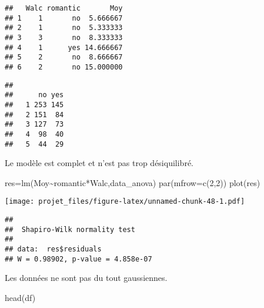 \documentclass[
]{article}
\newenvironment{Shaded}{\begin{snugshade}}{\end{snugshade}}
\newcommand{\AttributeTok}[1]{\textcolor[rgb]{0.77,0.63,0.00}{#1}}
\newcommand{\DecValTok}[1]{\textcolor[rgb]{0.00,0.00,0.81}{#1}}
\newcommand{\FunctionTok}[1]{\textcolor[rgb]{0.00,0.00,0.00}{#1}}
\newcommand{\NormalTok}[1]{#1}
\newcommand{\OtherTok}[1]{\textcolor[rgb]{0.56,0.35,0.01}{#1}}
\newcommand{\SpecialCharTok}[1]{\textcolor[rgb]{0.00,0.00,0.00}{#1}}
\begin{document}
\begin{verbatim}
##   Walc romantic       Moy
## 1    1       no  5.666667
## 2    1       no  5.333333
## 3    3       no  8.333333
## 4    1      yes 14.666667
## 5    2       no  8.666667
## 6    2       no 15.000000
\end{verbatim}

\begin{Shaded}
\end{Shaded}

\begin{verbatim}
##    
##      no yes
##   1 253 145
##   2 151  84
##   3 127  73
##   4  98  40
##   5  44  29
\end{verbatim}

Le modèle est complet et n'est pas trop désiquilibré.

\begin{Shaded}
\begin{Highlighting}[]
\NormalTok{res}\OtherTok{=}\FunctionTok{lm}\NormalTok{(Moy}\SpecialCharTok{\textasciitilde{}}\NormalTok{romantic}\SpecialCharTok{*}\NormalTok{Walc,data\_anova)}
\FunctionTok{par}\NormalTok{(}\AttributeTok{mfrow=}\FunctionTok{c}\NormalTok{(}\DecValTok{2}\NormalTok{,}\DecValTok{2}\NormalTok{))}
\FunctionTok{plot}\NormalTok{(res)}
\end{Highlighting}
\end{Shaded}

\texttt{[image: projet\_files/figure-latex/unnamed-chunk-48-1.pdf]}

\begin{Shaded}
\end{Shaded}

\begin{verbatim}
## 
##  Shapiro-Wilk normality test
## 
## data:  res$residuals
## W = 0.98902, p-value = 4.858e-07
\end{verbatim}

Les données ne sont pas du tout gaussiennes.

\begin{Shaded}
\begin{Highlighting}[]
\FunctionTok{head}\NormalTok{(df)}
\end{Highlighting}
\end{Shaded}
\end{document}
